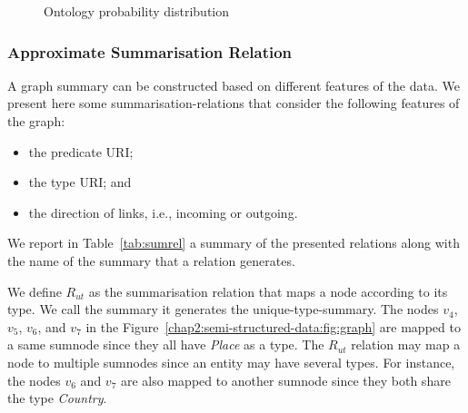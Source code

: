 \begin{figure}
	\centering
	
	\caption{Ontology probability distribution}
	\label{chap4:summary:fig:onto-dist}
\end{figure}


\subsubsection{Approximate Summarisation Relation}

A graph summary can be constructed based on different features of the data. We present here some \glspl{summarisation-relation} that consider the following features of the graph:
\begin{itemize}
	\item the predicate URI;
	\item the type URI; and
	\item the direction of links, i.e., incoming or outgoing.
\end{itemize}
We report in Table~\ref{tab:sumrel} a summary of the presented relations along with the name of the summary that a relation generates.


We define $R_{ut}$ as the summarisation relation that maps a node according to its type. We call the summary it generates the \gls{unique-type-summary}.
The nodes $v_4$, $v_5$, $v_6$, and $v_7$ in the Figure~\ref{chap2:semi-structured-data:fig:graph} are mapped to a same sumnode since they all have \emph{Place} as a type. The $R_{ut}$ relation may map a node to multiple sumnodes since an entity may have several \gls{types}. For instance, the nodes $v_6$ and $v_7$ are also mapped to another sumnode since they both share the type \emph{Country}.

